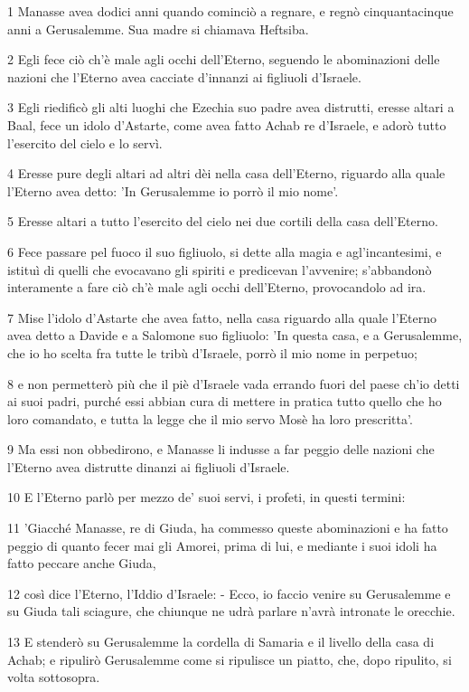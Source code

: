 \par 1 Manasse avea dodici anni quando cominciò a regnare, e regnò cinquantacinque anni a Gerusalemme. Sua madre si chiamava Heftsiba.
\par 2 Egli fece ciò ch'è male agli occhi dell'Eterno, seguendo le abominazioni delle nazioni che l'Eterno avea cacciate d'innanzi ai figliuoli d'Israele.
\par 3 Egli riedificò gli alti luoghi che Ezechia suo padre avea distrutti, eresse altari a Baal, fece un idolo d'Astarte, come avea fatto Achab re d'Israele, e adorò tutto l'esercito del cielo e lo servì.
\par 4 Eresse pure degli altari ad altri dèi nella casa dell'Eterno, riguardo alla quale l'Eterno avea detto: 'In Gerusalemme io porrò il mio nome'.
\par 5 Eresse altari a tutto l'esercito del cielo nei due cortili della casa dell'Eterno.
\par 6 Fece passare pel fuoco il suo figliuolo, si dette alla magia e agl'incantesimi, e istituì di quelli che evocavano gli spiriti e predicevan l'avvenire; s'abbandonò interamente a fare ciò ch'è male agli occhi dell'Eterno, provocandolo ad ira.
\par 7 Mise l'idolo d'Astarte che avea fatto, nella casa riguardo alla quale l'Eterno avea detto a Davide e a Salomone suo figliuolo: 'In questa casa, e a Gerusalemme, che io ho scelta fra tutte le tribù d'Israele, porrò il mio nome in perpetuo;
\par 8 e non permetterò più che il piè d'Israele vada errando fuori del paese ch'io detti ai suoi padri, purché essi abbian cura di mettere in pratica tutto quello che ho loro comandato, e tutta la legge che il mio servo Mosè ha loro prescritta'.
\par 9 Ma essi non obbedirono, e Manasse li indusse a far peggio delle nazioni che l'Eterno avea distrutte dinanzi ai figliuoli d'Israele.
\par 10 E l'Eterno parlò per mezzo de' suoi servi, i profeti, in questi termini:
\par 11 'Giacché Manasse, re di Giuda, ha commesso queste abominazioni e ha fatto peggio di quanto fecer mai gli Amorei, prima di lui, e mediante i suoi idoli ha fatto peccare anche Giuda,
\par 12 così dice l'Eterno, l'Iddio d'Israele: - Ecco, io faccio venire su Gerusalemme e su Giuda tali sciagure, che chiunque ne udrà parlare n'avrà intronate le orecchie.
\par 13 E stenderò su Gerusalemme la cordella di Samaria e il livello della casa di Achab; e ripulirò Gerusalemme come si ripulisce un piatto, che, dopo ripulito, si volta sottosopra.
